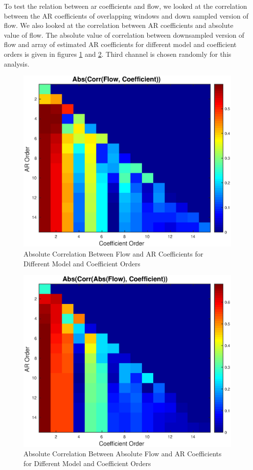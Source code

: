 \documentclass[a4paper,onesided,12pt]{report}
\begin{document}
To test the relation between ar coefficients and flow, we looked at the correlation between the AR coefficients of overlapping windows and down sampled version of flow. We also looked at the correlation between AR coefficients and absolute value of flow. The absolute value of correlation between downsampled version of flow and array of estimated AR coefficients for different model and coefficient orders is given in figures \ref{winArNormalCorr} and \ref{winArAbsCorr}. Third channel is chosen randomly for this analysis.
\begin{figure}[H]
	\centering
	\includegraphics[width=0.7\linewidth]{windowAr_NormalOrders.eps}
	\caption{Absolute Correlation Between Flow and AR Coefficients for Different Model and Coefficient Orders}
	\label{winArNormalCorr}
\end{figure}
\begin{figure}[H]
	\centering
	\includegraphics[width=0.7\linewidth]{windowAr_AbsOrders.eps}
	\caption{Absolute Correlation Between Absolute Flow and AR Coefficients for Different Model and Coefficient Orders}
	\label{winArAbsCorr}
\end{figure}
\end{document}
